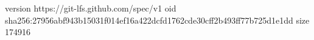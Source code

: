 version https://git-lfs.github.com/spec/v1
oid sha256:27956abf943b15031f014ef16a422dcfd1762cde30cff2b493ff77b725d1e1dd
size 174916
